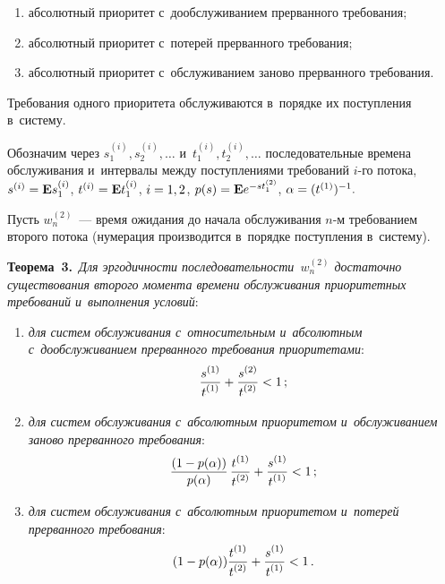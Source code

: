 \begin{multicols}{2}
\begin{enumerate}[(1)]
\item абсолютный приоритет с~дообслуживанием
прерванного требования;

\item абсолютный приоритет с~потерей
прерванного требования;

\item абсолютный приоритет с~обслуживанием заново
прерванного требования.
\end{enumerate}

 Требования одного приоритета обслуживаются
в~порядке их поступления в~сис\-тему.

Обозначим через $s_1^{(i)}, s_2^{(i)},\ldots$ 
и~$t_1^{(i)}, t_2^{(i)},\ldots$ последовательные времена
обслуживания и~интервалы между поступлениями требований $i$-го
потока, $s^{(i)}\hm=\mathbf{E} s_1^{(i)}$, 
$t^{(i)}\hm=\mathbf{E} t_1^{(i)}$, $i\hm=1,2$,
$p(s)\hm=\mathbf{E} e^{-st_1^{(2)}}$, $\alpha\hm=(t^{(1)})^{-1}.$

Пусть $w_n^{(2)}$~--- время ожидания до начала обслуживания $n$-м
требованием второго потока (нумерация производится в~порядке
поступления в~сис\-тему).


\smallskip

\noindent
\textbf{Теорема~3.}\
\textit{Для эргодичности последо\-ва\-тель\-ности~$w_n^{(2)}$ достаточно
существования второго момента времени обслуживания приоритетных
требований и~выполнения условий}:
\begin{enumerate}[(1)]
\item
\textit{для систем обслуживания с~относительным и~абсолютным 
с~дообслуживанием прерванного требования приоритетами}:
$$\displaystyle
\displaystyle\frac{\displaystyle s^{(1)}\mathstrut}{\displaystyle t^{(1)}\mathstrut}+\displaystyle\frac{\displaystyle s^{(2)}\mathstrut}{\displaystyle t^{(2)}\mathstrut}<1\,;
$$

\item \textit{для сис\-тем обслуживания с~абсолютным приоритетом и~обслуживанием
заново прерванного требования}:
$$\displaystyle
\displaystyle\frac{\displaystyle (1-p(\alpha))\mathstrut}{\displaystyle p(\alpha)\mathstrut}\,\displaystyle\frac{\displaystyle t^{(1)}\mathstrut}{\displaystyle t^{(2)}\mathstrut}+\displaystyle\frac{\displaystyle s^{(1)}\mathstrut}{\displaystyle t^{(1)}\mathstrut}<1\,;
$$


\item \textit{для сис\-тем обслуживания с~абсолютным приоритетом и~потерей
прерванного требования}:
$$\displaystyle
(1-p(\alpha))\displaystyle\frac{\displaystyle t^{(1)}\mathstrut}{\displaystyle t^{(2)}\mathstrut}+\displaystyle\frac{\displaystyle s^{(1)}\mathstrut}{\displaystyle t^{(1)}\mathstrut}<1\,.
$$

\end{enumerate}



\end{multicols}
